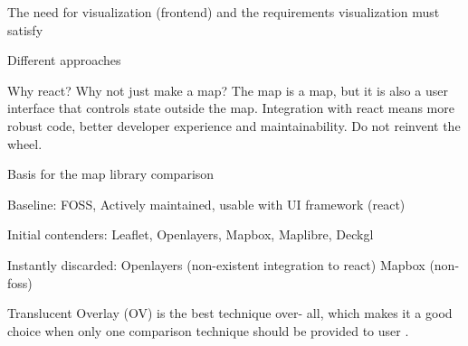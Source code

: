 The need for visualization (frontend) and the requirements visualization must satisfy

Different approaches

Why react? Why not just make a map?
The map is a map, but it is also a user interface that controls state outside the map.
Integration with react means more robust code, better developer experience and maintainability.
Do not reinvent the wheel.

Basis for the map library comparison

Baseline: FOSS, Actively maintained, usable with UI framework (react)

Initial contenders: Leaflet, Openlayers, Mapbox, Maplibre, Deckgl

Instantly discarded: Openlayers (non-existent integration to react) Mapbox (non-foss)

Translucent Overlay (OV) is the best technique over-
all, which makes it a good choice when only one comparison
technique should be provided to user \parencite{lob2015}.








